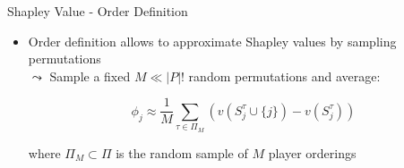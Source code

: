 \documentclass[10pt,compress,t,notes=noshow, xcolor=table]{beamer}
\newcommand{\Stau}{S_{j}^\tau}%
\begin{document}
\begin{frame}{Shapley Value - Order Definition}
\begin{itemize}[<+->]
  \phantom{$\Rightarrow$} $\leadsto$ For joining order $\tau = (\footnotesize\colorcircle{playerblue}{white}{3},\colorcircle{playerred}{white}{1},\colorcircle{playeryellow}{white}{2})$ and player  $j=\footnotesize\colorcircle{playerred}{white}{1}$ $\Rightarrow$ $\Stau = \footnotesize\{\colorcircle{playerblue}{white}{3}\}$
\item<3-> Order definition allows to approximate Shapley values by sampling permutations \\
\(\leadsto\) Sample a fixed \( M \ll |P|! \) random permutations and average:

\[
\phi_j \approx \frac{1}{M} \sum_{\tau \in \Pi_M} \left(v(\Stau \cup \{j\}) - v(\Stau)\right)
\]

where \( \Pi_M \subset \Pi \) is the random sample of \( M \) player orderings
\end{itemize}

\end{frame}
\end{document}
